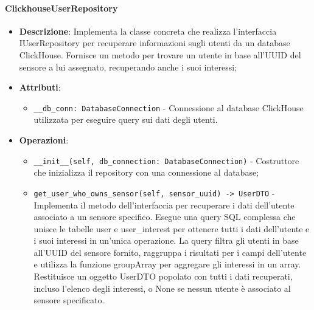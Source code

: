 \documentclass[10pt]{article}
\begin{document}
    \paragraph{ClickhouseUserRepository}
    \begin{itemize} 
    \item \textbf{Descrizione}: Implementa la classe concreta che realizza l'interfaccia IUserRepository per recuperare informazioni sugli utenti da un database ClickHouse. Fornisce un metodo per trovare un utente in base all'UUID del sensore a lui assegnato, recuperando anche i suoi interessi;
    \item \textbf{Attributi}:
    \begin{itemize}
        \item \texttt{\_\_db\_conn: DatabaseConnection} - Connessione al database ClickHouse utilizzata per eseguire query sui dati degli utenti.
    \end{itemize}
    
    \item \textbf{Operazioni}:
    \begin{itemize}
        \item \texttt{\_\_init\_\_(self, db\_connection: DatabaseConnection)} - Costruttore che inizializza il repository con una connessione al database;
        
        \item \texttt{get\_user\_who\_owns\_sensor(self, sensor\_uuid) -> UserDTO} - Implementa il metodo dell'interfaccia per recuperare i dati dell'utente associato a un sensore specifico. Esegue una query SQL complessa che unisce le tabelle user e user\_interest per ottenere tutti i dati dell'utente e i suoi interessi in un'unica operazione. La query filtra gli utenti in base all'UUID del sensore fornito, raggruppa i risultati per i campi dell'utente e utilizza la funzione groupArray per aggregare gli interessi in un array. Restituisce un oggetto UserDTO popolato con tutti i dati recuperati, incluso l'elenco degli interessi, o None se nessun utente è associato al sensore specificato.
    \end{itemize}
    \end{itemize}
\end{document}
